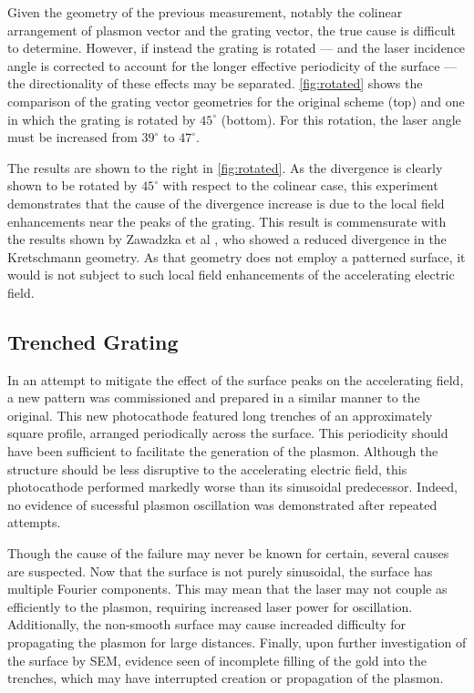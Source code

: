 Given the geometry of the previous measurement, notably the colinear arrangement of plasmon vector and the grating vector, the true cause is difficult to determine.
However, if instead the grating is rotated --- and the laser incidence angle is corrected to account for the longer effective periodicity of the surface --- the directionality of these effects may be separated.
\ref{fig:rotated} shows the comparison of the grating vector geometries for the original scheme (top) and one in which the grating is rotated by $45^{\circ}$ (bottom).
For this rotation, the laser angle must be increased from $39^{\circ}$ to $47^{\circ}$.

The results are shown to the right in \ref{fig:rotated}.
As the divergence is clearly shown to be rotated by $45^{\circ}$ with respect to the colinear case, this experiment demonstrates that the cause of the divergence increase is due to the local field enhancements near the peaks of the grating.
This result is commensurate with the results shown by Zawadzka et al \cite{zawadzka_evanescent_2001}, who showed a reduced divergence in the Kretschmann geometry.
As that geometry does not employ a patterned surface, it would is not subject to such local field enhancements of the accelerating electric field.

\subsection{Trenched Grating}

In an attempt to mitigate the effect of the surface peaks on the accelerating field, a new pattern was commissioned and prepared in a similar manner to the original.
This new photocathode featured long trenches of an approximately square profile, arranged periodically across the surface.
This periodicity should have been sufficient to facilitate the generation of the plasmon.
Although the structure should be less disruptive to the accelerating electric field, this photocathode performed markedly worse than its sinusoidal predecessor.
Indeed, no evidence of sucessful plasmon oscillation was demonstrated after repeated attempts.

Though the cause of the failure may never be known for certain, several causes are suspected.
Now that the surface is not purely sinusoidal, the surface has multiple Fourier components.
This may mean that the laser may not couple as efficiently to the plasmon, requiring increased laser power for oscillation. 
Additionally, the non-smooth surface may cause increaded difficulty for propagating the plasmon for large distances.
Finally, upon further investigation of the surface by SEM, evidence seen of incomplete filling of the gold into the trenches, which may have interrupted creation or propagation of the plasmon.

